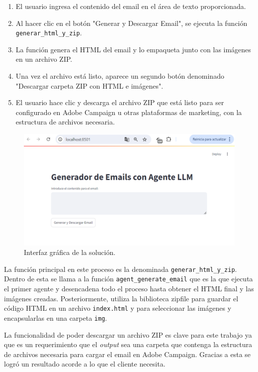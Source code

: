 \begin{enumerate}
    \item El usuario ingresa el contenido del email en el área de texto proporcionada.
    \item Al hacer clic en el botón "Generar y Descargar Email", se ejecuta la función \texttt{generar\_html\_y\_zip}.
    \item La función genera el HTML del email y lo empaqueta junto con las imágenes en un archivo ZIP.
    \item Una vez el archivo está listo, aparece un segundo botón denominado "Descargar carpeta ZIP con HTML e imágenes".
    \item El usuario hace clic y descarga el archivo ZIP que está listo para ser configurado en Adobe Campaign u otras plataformas de marketing, con la estructura de archivos necesaria.
\end{enumerate}

\begin{figure}[!htpb]
    \centering
    \includegraphics[width=1\linewidth]{Figures/interfaz_generador_email.png}
    \caption{Interfaz gráfica de la solución.}
    \label{fig:interfaz}
\end{figure}

La función principal en este proceso es la denominada \texttt{generar\_html\_y\_zip}. Dentro de esta se llama a la función \texttt{agent\_generate\_email} que es la que ejecuta el primer agente y desencadena todo el proceso hasta obtener el HTML final y las imágenes creadas. Posteriormente, utiliza la biblioteca zipfile para guardar el código HTML en un archivo \texttt{index.html} y para seleccionar las imágenes y encapsularlas en una carpeta \texttt{img}.

La funcionalidad de poder descargar un archivo ZIP es clave para este trabajo ya que es un requerimiento que el \textit{output} sea una carpeta que contenga la estructura de archivos necesaria para cargar el email en Adobe Campaign. Gracias a esta se logró un resultado acorde a lo que el cliente necesita.

